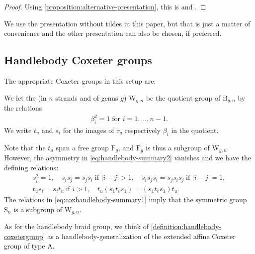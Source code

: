 \documentclass[a4paper,11pt]{amsart}
\let\emph\relax
\renewcommand{\dots}{\text{...}}
\newcommand{\setstuff}[1]{\mathrm{#1}}
\numberwithin{equation}{section}
\let\fullref\autoref
\begin{document}
\begin{proof}
Using \fullref{proposition:alternative-presentation}, this is 
\cite[Theorem 1]{Ve-handlebodies}
and \cite[Section 5]{La-handlebodies}.
\end{proof}

We use the presentation without tildes in this paper, but that is just a 
matter of convenience and the other presentation can also be chosen, if preferred.

\subsection{Handlebody Coxeter groups}\label{subsection:coxdia}

The appropriate Coxeter groups in this setup are:

\begin{definition}\label{definition:handlebody-coxetergroup}
We let the \emph{handlebody Coxeter group} (in $n$ strands and of genus $g$)
$\setstuff{W}_{g,n}$ be the quotient group of 
$\setstuff{B}_{g,n}$ by the relations
\begin{gather*}
\beta_{i}^{2}=1
\;\text{for }i=1,\dots,n-1.
\end{gather*}
We write $t_{u}$ and $s_{i}$ for the images of 
$\tau_{u}$ respectively $\beta_{i}$ in the quotient.
\end{definition}

Note that the $t_{u}$ span a free group $\setstuff{F}_{g}$, 
and $\setstuff{F}_{g}$ is thus a subgroup of $\setstuff{W}_{g,n}$.
However, the asymmetry in \eqref{eq:handlebody-summary2} 
vanishes and we have the defining relations:
\begin{gather}
\label{eq:coxhandlebody-summary1}
s_{i}^{2}=1
,\quad
s_{i}s_{j}=s_{j}s_{i}\;\text{if }|i-j|>1,
\quad
s_{i}s_{j}s_{i}=s_{j}s_{i}s_{j}\;\text{if }|i-j|=1,
\\
\label{eq:coxhandlebody-summary2}
t_{u}s_{i}
=s_{i}t_{u}\;\text{if }i>1,
\quad
t_{u}(s_{1}t_{v}s_{1})
=(s_{1}t_{v}s_{1})t_{u}
.
\end{gather}
The relations in \eqref{eq:coxhandlebody-summary1} imply that 
the symmetric group $\setstuff{S}_{n}$ is 
a subgroup of $\setstuff{W}_{g,n}$.

As for the handlebody braid group, we think of \fullref{definition:handlebody-coxetergroup} as a 
handlebody-generalization of the extended affine Coxeter group of type A. 
\end{document}
